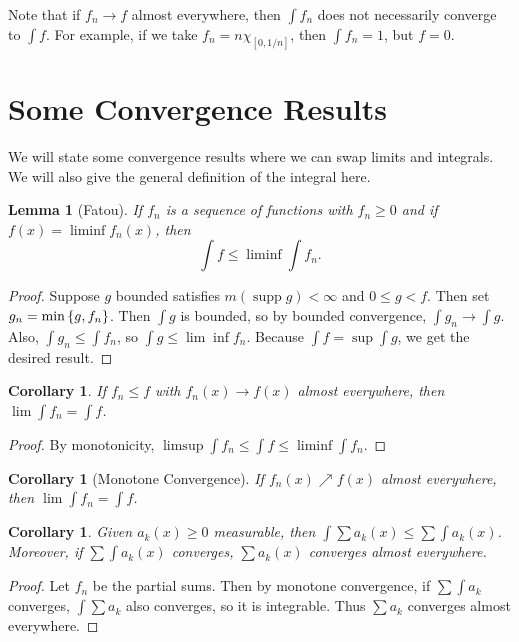 \documentclass[leqno, openany]{memoir}
\newtheorem{cor}[thm]{Corollary}
\newtheorem{lem}[thm]{Lemma}
\theoremstyle{definition}
\theoremstyle{remark}
\theoremstyle{plain}
\theoremstyle{definition}
\theoremstyle{remark}
\DeclareMathOperator{\supp}{supp}
\begin{document}
Note that if $f_n \to f$ almost everywhere, then $\int f_n$ does not necessarily converge to $\int f$. For example, if we take $f_n = n \chi_{[0,1/n]}$, then $\int f_n = 1$, but $f = 0$.

\section{Some Convergence Results}%
\label{sec:some_convergence_results}

We will state some convergence results where we can swap limits and integrals. We will also give the general definition of the integral here.

\begin{lem}[Fatou]
    If $f_n$ is a sequence of functions with $f_n \geq 0$ and if $f(x) = \liminf f_n(x)$, then 
    \[ \int f \leq \liminf \int f_n. \]
\end{lem}

\begin{proof}
    Suppose $g$ bounded satisfies $m(\supp g) < \infty$ and $0 \leq g < f$. Then set $g_n = \min \qty{g,f_n}$. Then $\int g$ is bounded, so by bounded convergence, $\int g_n \to \int g$. Also, $\int g_n \leq \int f_n$, so $\int g \leq \lim \inf f_n$. Because $\int f = \sup \int g$, we get the desired result.
\end{proof}

\begin{cor}
    If $f_n \leq f$ with $f_n(x) \to f(x)$ almost everywhere, then $\lim \int f_n = \int f$.
\end{cor}

\begin{proof}
    By monotonicity, $\limsup \int f_n \leq \int f \leq \liminf \int f_n$.
\end{proof}

\begin{cor}[Monotone Convergence]
    If $f_n(x) \nearrow f(x)$ almost everywhere, then $\lim \int f_n = \int f$.
\end{cor}

\begin{cor}
    Given $a_k(x) \geq 0$ measurable, then $\int \sum a_k(x) \leq \sum \int a_k(x)$. Moreover, if $\sum \int a_k(x)$ converges, $\sum a_k(x)$ converges almost everywhere.
\end{cor}

\begin{proof}
    Let $f_n$ be the partial sums. Then by monotone convergence, if $\sum \int a_k$ converges, $\int \sum a_k$ also converges, so it is integrable. Thus $\sum a_k$ converges almost everywhere.
\end{proof}
\end{document}
